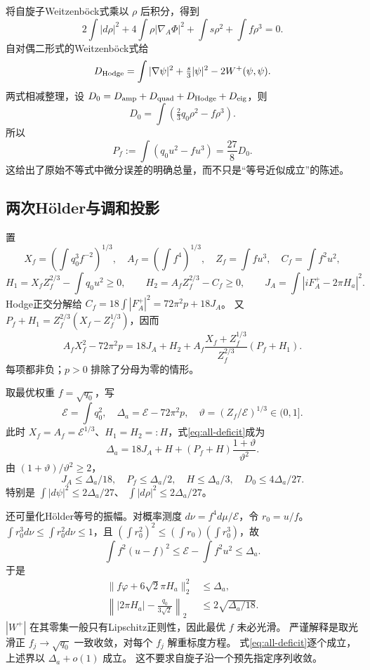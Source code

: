 \documentclass[UTF8,a4paper,11pt,fontset=fandol]{ctexart}
\numberwithin{equation}{section}
\theoremstyle{definition}
\begin{document}
将自旋子Weitzenb\"ock式乘以 $\rho$ 后积分，得到
\[
2\int|d\rho|^2+4\int\rho|\nabla_A\Phi|^2+\int s\rho^2+\int f\rho^3=0.
\]
自对偶二形式的Weitzenb\"ock式给
\[
D_{\rm Hodge}=\int|\nabla\psi|^2+\tfrac{s}{3}|\psi|^2-2W^+(\psi,\psi).
\]
两式相减整理，设 $D_0=D_{\rm amp}+D_{\rm quad}+D_{\rm Hodge}+D_{\rm eig}$，则
\[
D_0=\int\left(\tfrac23q_0\rho^2-f\rho^3\right).
\]
所以
\begin{equation}\label{eq:spinor-deficit}
P_f:=\int(q_0u^2-fu^3)=\frac{27}{8}D_0.
\end{equation}
这给出了原始不等式中微分误差的明确总量，而不只是“等号近似成立”的陈述。

\subsection{两次H\"older与调和投影}
置
\[
X_f=\left(\int q_0^3f^{-2}\right)^{1/3},\quad
A_f=\left(\int f^4\right)^{1/3},\quad
Z_f=\int fu^3,\quad C_f=\int f^2u^2,
\]
\[
H_1=X_fZ_f^{2/3}-\int q_0u^2\ge0,\qquad
H_2=A_fZ_f^{2/3}-C_f\ge0,\qquad
J_A=\int|iF_A^+-2\pi H_a|^2.
\]
Hodge正交分解给
$C_f=18\int|F_A^+|^2=72\pi^2p+18J_A$。
又 $P_f+H_1=Z_f^{2/3}(X_f-Z_f^{1/3})$，因而
\begin{equation}\label{eq:all-deficit}
A_fX_f^2-72\pi^2p
=18J_A+H_2+
A_f\frac{X_f+Z_f^{1/3}}{Z_f^{2/3}}(P_f+H_1).
\end{equation}
每项都非负；$p>0$ 排除了分母为零的情形。

取最优权重 $f=\sqrt{q_0}$，写
\[
\mathcal E=\int q_0^2,\quad
\Delta_a=\mathcal E-72\pi^2p,\quad
\vartheta=(Z_f/\mathcal E)^{1/3}\in(0,1].
\]
此时 $X_f=A_f=\mathcal E^{1/3}$、$H_1=H_2=:H$，式\eqref{eq:all-deficit}成为
\[
\Delta_a=18J_A+H+(P_f+H)\frac{1+\vartheta}{\vartheta^2}.
\]
由 $(1+\vartheta)/\vartheta^2\ge2$，
\begin{equation}\label{eq:quantSW}
J_A\le\Delta_a/18,\quad P_f\le\Delta_a/2,\quad
H\le\Delta_a/3,\quad D_0\le4\Delta_a/27.
\end{equation}
特别是
$\int|d\psi|^2\le2\Delta_a/27$、
$\int|d\rho|^2\le2\Delta_a/27$。

还可量化H\"older等号的振幅。对概率测度
$d\nu=f^4d\mu/\mathcal E$，令 $r_0=u/f$。
$\int r_0^3d\nu\le\int r_0^2d\nu\le1$，且
$(\int r_0^2)^2\le(\int r_0)(\int r_0^3)$，故
\[
\int f^2(u-f)^2\le\mathcal E-\int f^2u^2\le\Delta_a.
\]
于是
\begin{align}
\|f\varphi+6\sqrt2\pi H_a\|_2^2&\le\Delta_a,\label{eq:formprojection}\\
\left\||2\pi H_a|-\frac{q_0}{3\sqrt2}\right\|_2
&\le2\sqrt{\Delta_a/18}.\label{eq:harmonicnorm}
\end{align}
$|W^+|$ 在其零集一般只有Lipschitz正则性，因此最优 $f$ 未必光滑。
严谨解释是取光滑正 $f_j\to\sqrt{q_0}$ 一致收敛，对每个 $f_j$ 解重标度方程。
式\eqref{eq:all-deficit}逐个成立，上述界以 $\Delta_a+o(1)$ 成立。
这不要求自旋子沿一个预先指定序列收敛。
\end{document}
